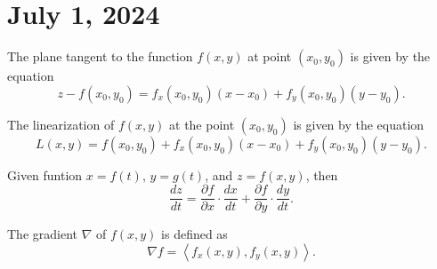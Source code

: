 \chapter{July 1, 2024}

\begin{proposition}
    The plane tangent to the function $f(x, y)$ at point $(x_{0}, y_{0})$ is given by the equation
    \[z - f(x_{0}, y_{0}) = f_{x}(x_{0}, y_{0})(x - x_{0}) + f_{y}(x_{0}, y_{0})(y - y_{0}).\]
\end{proposition}

\begin{corollary}
    The linearization of $f(x, y)$ at the point $(x_{0}, y_{0})$ is given by the equation
    \[L(x, y) = f(x_{0}, y_{0}) + f_{x}(x_{0}, y_{0})(x - x_{0}) + f_{y}(x_{0}, y_{0})(y - y_{0}).\]
\end{corollary}

\begin{proposition}
    Given funtion $x = f(t)$, $y = g(t)$, and $z = f(x, y)$, then
    \[\frac{dz}{dt} = \frac{\partial f}{\partial x} \cdot \frac{dx}{dt} + \frac{\partial f}{\partial y} \cdot \frac{dy}{dt}.\]
\end{proposition}

\begin{definition}
    The gradient $\nabla$ of $f(x, y)$ is defined as
    \[\nabla f = \left<f_{x}(x, y), f_{y}(x, y)\right>.\]
\end{definition}